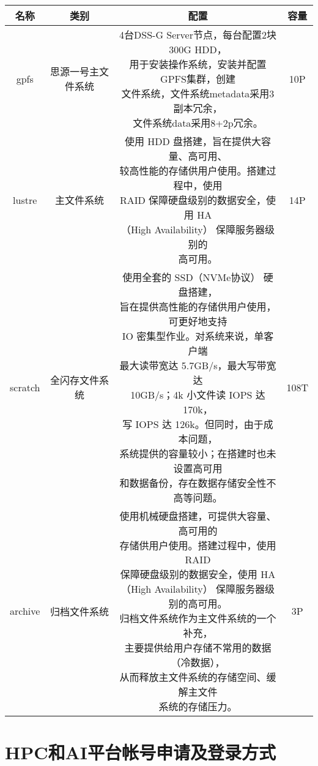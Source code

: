 \documentclass[cn, 12pt, hang, black, chinese]{elegantbook}
\begin{document}
\begin{table2}
\begin{tabular}{ |c|c|c|c| }
 \hline
 名称 & 类别 & 配置 & 容量 \\
 \hline \hline
 gpfs & 思源一号主文件系统 & \makecell[l]{4台DSS-G Server节点，每台配置2块300G HDD，\\ 用于安装操作系统，安装并配置GPFS集群，创建\\ 文件系统，文件系统metadata采用3副本冗余，\\ 文件系统data采用8+2p冗余。} & 10P\\
 \hline
 lustre & 主文件系统 & \makecell[l]{使用 HDD 盘搭建，旨在提供大容量、高可用、\\较高性能的存储供用户使用。搭建过程中，使用\\ RAID 保障硬盘级别的数据安全，使用 HA\\（High Availability） 保障服务器级别的\\高可用。} & 14P\\
 \hline
 scratch & 全闪存文件系统 & \makecell[l]{使用全套的 SSD（NVMe协议） 硬盘搭建，\\旨在提供高性能的存储供用户使用，可更好地支持\\ IO 密集型作业。对系统来说，单客户端\\最大读带宽达 5.7GB/s，最大写带宽达\\ 10GB/s；4k 小文件读 IOPS 达 170k，\\写 IOPS 达 126k。但同时，由于成本问题，\\系统提供的容量较小；在搭建时也未设置高可用\\和数据备份，存在数据存储安全性不高等问题。} & 108T\\
 \hline
 archive & 归档文件系统 & \makecell[l]{使用机械硬盘搭建，可提供大容量、高可用的\\存储供用户使用。搭建过程中，使用 RAID \\保障硬盘级别的数据安全，使用 HA\\（High Availability） 保障服务器级别的高可用。\\归档文件系统作为主文件系统的一个补充，\\主要提供给用户存储不常用的数据（冷数据），\\从而释放主文件系统的存储空间、缓解主文件\\系统的存储压力。} & 3P\\
 \hline
\end{tabular}
\end{table2}

\chapter{HPC和AI平台帐号申请及登录方式}
\end{document}
